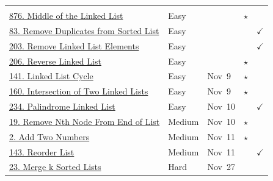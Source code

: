 \documentclass{article}
\begin{document}
\begin{longtable}{p{7.5cm} l l c c}
\rowcolor{gray!20} \multicolumn{5}{l}{\textbf{6. Linked List}} \\
\href{https://leetcode.com/problems/middle-of-the-linked-list/}{876. Middle of the Linked List} & Easy & & $\star$ & \\
\href{https://leetcode.com/problems/remove-duplicates-from-sorted-list/}{83. Remove Duplicates from Sorted List} & Easy & & & $\checkmark$ \\
\href{https://leetcode.com/problems/remove-linked-list-elements/}{203. Remove Linked List Elements} & Easy & & & $\checkmark$ \\
\href{https://leetcode.com/problems/reverse-linked-list/}{206. Reverse Linked List} & Easy & & $\star$ & \\
\href{https://leetcode.com/problems/linked-list-cycle/}{141. Linked List Cycle} & Easy & Nov~9 & $\star$ & \\
\href{https://leetcode.com/problems/intersection-of-two-linked-lists/}{160. Intersection of Two Linked Lists} & Easy & Nov~9 & $\star$ & \\
\href{https://leetcode.com/problems/palindrome-linked-list/}{234. Palindrome Linked List} & Easy & Nov~10 & & $\checkmark$ \\
\href{https://leetcode.com/problems/remove-nth-node-from-end-of-list/}{19. Remove Nth Node From End of List} & Medium & Nov~10 & $\star$ & \\
\href{https://leetcode.com/problems/add-two-numbers/}{2. Add Two Numbers} & Medium & Nov~11 & $\star$ & \\
\href{https://leetcode.com/problems/reorder-list/}{143. Reorder List} & Medium & Nov~11 & & $\checkmark$ \\
\href{https://leetcode.com/problems/merge-k-sorted-lists/}{23. Merge k Sorted Lists} & Hard & Nov~27 & & \\


\end{longtable}
\end{document}

